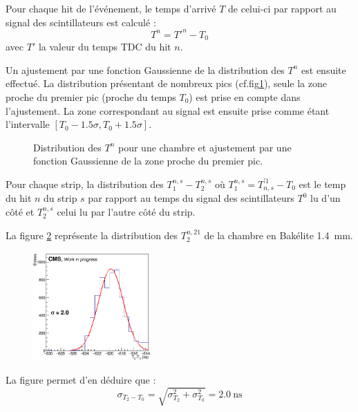 Pour chaque hit de l'événement, le temps d'arrivé $T$ de celui-ci par rapport au signal des scintillateurs est calculé :
\begin{equation}
	T^n=T'^n-T_0
\end{equation}
avec $T'$ la valeur du temps TDC du hit $n$. 

Un ajustement par une fonction Gaussienne de la distribution des $T^n$ est ensuite effectué. La distribution présentant de nombreux pics (cf.fig\ref{pics}), seule la zone proche du premier pic (proche du temps $T_0$) est prise en compte dans l'ajustement. La zone correspondant au signal est ensuite prise comme étant l'intervalle $\left[T_0-\num{1.5}\sigma,T_0+\num{1.5}\sigma\right]$.

\begin{figure}[!ht]
	\centering
	\caption{Distribution des $T^n$ pour une chambre et ajustement par une fonction Gaussienne de la zone proche du premier pic.}
	\label{pics}
\end{figure}

Pour chaque strip, la distribution des $T^{n,s}_1-T^{n,s}_2$ où $T^{n,s}_1=T_{n,s}^{'1}-T_0$ est le temp du hit $n$ du strip $s$ par rapport au temps du signal des scintillateurs $T^{0}$ lu d'un côté et $T^{n,s}_2$ celui lu par l'autre côté du strip.

La figure \ref{t2t0} représente la distribution des $T^{n,21}_2$ de la chambre en Bakélite \SI{1.4}{\milli\meter}.
\begin{figure}[ht!]
	\centering
	\includegraphics[width=0.40\textwidth]{ELE/TimingFitsRunT1T0_zoom_736185.jpg}
	\label{t2t0}
\end{figure}

La figure permet d'en déduire que :
\begin{equation}
\sigma_{T_2-T_0}=\sqrt{\sigma_{T_2}^2+\sigma_{T_0}^2}=\SI{2.0}{\nano\second}
\end{equation}

